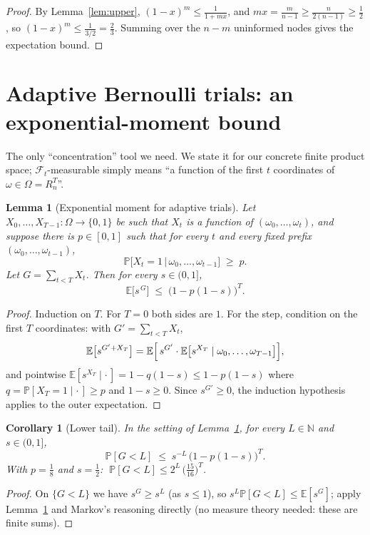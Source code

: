 \documentclass[11pt]{article}
\newtheorem{lemma}[theorem]{Lemma}
\newtheorem{corollary}[theorem]{Corollary}
\newcommand{\E}{\mathbb{E}}
\renewcommand{\Pr}{\mathbb{P}}
\newcommand{\N}{\mathbb{N}}
\newcommand{\Fcal}{\mathcal{F}}
\begin{document}
\begin{proof}
By Lemma~\ref{lem:upper}, $(1-x)^m \le \frac{1}{1+mx}$, and
$mx = \frac{m}{n-1} \ge \frac{n}{2(n-1)} \ge \frac12$, so
$(1-x)^m \le \frac{1}{3/2} = \frac23$.  Summing over the $n-m$ uninformed
nodes gives the expectation bound.
\end{proof}

\section{Adaptive Bernoulli trials: an exponential-moment bound}
\label{sec:adaptive}

The only ``concentration'' tool we need.  We state it for our concrete finite
product space; $\Fcal_t$-measurable simply means ``a function of the first $t$
coordinates of $\omega \in \Omega = R_n^T$''.

\begin{lemma}[Exponential moment for adaptive trials]\label{lem:adaptive}
Let $X_0, \dots, X_{T-1} \colon \Omega \to \{0,1\}$ be such that $X_t$ is a
function of $(\omega_0,\dots,\omega_t)$, and suppose there is $p \in [0,1]$
such that for every $t$ and every fixed prefix
$(\omega_0,\dots,\omega_{t-1})$,
\[
  \Pr\bigl[X_t = 1 \,\big|\, \omega_0,\dots,\omega_{t-1}\bigr] \;\ge\; p .
\]
Let $G = \sum_{t<T} X_t$.  Then for every $s \in (0,1]$,
\[
  \E\bigl[s^{\,G}\bigr] \;\le\; \bigl(1 - p(1-s)\bigr)^{T}.
\]
\end{lemma}

\begin{proof}
Induction on $T$.  For $T=0$ both sides are $1$.  For the step, condition on
the first $T$ coordinates: with $G' = \sum_{t<T} X_t$,
\[
  \E\bigl[s^{G'+X_T}\bigr]
  = \E\Bigl[\, s^{G'} \cdot \E\bigl[s^{X_T} \mid \omega_0,\dots,\omega_{T-1}\bigr] \Bigr],
\]
and pointwise
$\E[s^{X_T} \mid \cdot\,] = 1 - q(1-s) \le 1 - p(1-s)$
where $q = \Pr[X_T = 1 \mid \cdot\,] \ge p$ and $1-s \ge 0$.  Since $s^{G'}
\ge 0$, the induction hypothesis applies to the outer expectation.
\end{proof}

\begin{corollary}[Lower tail]\label{cor:tail}
In the setting of Lemma~\ref{lem:adaptive}, for every $L \in \N$ and
$s \in (0,1]$,
\[
  \Pr[G < L] \;\le\; s^{-L}\,\bigl(1-p(1-s)\bigr)^{T}.
\]
With $p = \tfrac18$ and $s = \tfrac12$:
$\;\Pr[G < L] \le 2^{L}\,\bigl(\tfrac{15}{16}\bigr)^{T}$.
\end{corollary}

\begin{proof}
On $\{G < L\}$ we have $s^G \ge s^L$ (as $s \le 1$), so
$s^L \Pr[G < L] \le \E[s^G]$; apply Lemma~\ref{lem:adaptive} and Markov's
reasoning directly (no measure theory needed: these are finite sums).
\end{proof}
\end{document}
